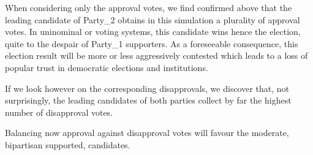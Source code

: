 \documentclass[a4paper,12pt,english]{sphinxhowto}
\begin{document}
\sphinxAtStartPar
When considering only the approval votes, we find confirmed above that the leading candidate of Party\_2 obtains in this simulation a plurality of approval votes. In uninominal  or  voting systems, this candidate wins hence the election, quite to the despair of Party\_1 supporters. As a foreseeable consequence, this election result will be more or less aggressively contested which leads to a loss of popular trust in democratic elections and institutions.

\sphinxAtStartPar
If we look however on the corresponding disapprovals, we discover that, not surprisingly, the leading candidates of both parties collect by far the highest number of disapproval votes.

%
\begin{sphinxVerbatim}[commandchars=\\\{\},numbers=left,firstnumber=1,stepnumber=1]
\end{sphinxVerbatim}
\sphinxresetverbatimhllines

\sphinxAtStartPar
Balancing now approval against disapproval votes will favour the moderate, bipartisan supported, candidates.
\end{document}
